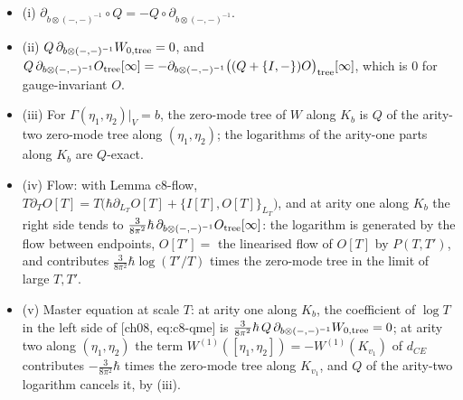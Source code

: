 \begin{proposition}
\label{prop:ktr-consistency}
\begin{itemize}
\item (i) $\partial_{b\otimes(-,-)^{-1}}\circ Q=-Q\circ\partial_{b\otimes(-,-)^{-1}}$.
\item (ii) $Q\,\partial_{b\otimes(-,-)^{-1}}W_{0,\rm tree}=0$, and $Q\,\partial_{b\otimes(-,-)^{-1}}O_{\rm tree}[\infty]=-\partial_{b\otimes(-,-)^{-1}}\big((Q+\{I,-\})O\big)_{\rm tree}[\infty]$, which is $0$ for gauge-invariant $O$.
\item (iii) For $\Gamma(\eta_1,\eta_2)|_V=b$, the zero-mode tree of $W$ along $K_b$ is $Q$ of the arity-two zero-mode tree along $(\eta_1,\eta_2)$; the logarithms of the arity-one parts along $K_b$ are $Q$-exact.
\item (iv) Flow: with Lemma c8-flow, $T\partial_TO[T]=T\big(\hbar\partial_{L_T}O[T]+\{I[T],O[T]\}_{L_T}\big)$, and at arity one along $K_b$ the right side tends to $\tfrac{3}{8\pi^2}\hbar\,\partial_{b\otimes(-,-)^{-1}}O_{\rm tree}[\infty]$: the logarithm is generated by the flow between endpoints, $O[T']=$ the linearised flow of $O[T]$ by $P(T,T')$, and contributes $\tfrac{3}{8\pi^2}\hbar\log(T'/T)$ times the zero-mode tree in the limit of large $T,T'$.
\item (v) Master equation at scale $T$: at arity one along $K_b$, the coefficient of $\log T$ in the left side of [ch08, eq:c8-qme] is $\tfrac{3}{8\pi^2}\hbar\,Q\,\partial_{b\otimes(-,-)^{-1}}W_{0,\rm tree}=0$; at arity two along $(\eta_1,\eta_2)$ the term $W^{(1)}([\eta_1,\eta_2])=-W^{(1)}(K_{v_1})$ of $d_{CE}$ contributes $-\tfrac{3}{8\pi^2}\hbar$ times the zero-mode tree along $K_{v_1}$, and $Q$ of the arity-two logarithm cancels it, by (iii).
\end{itemize}
\end{proposition}


